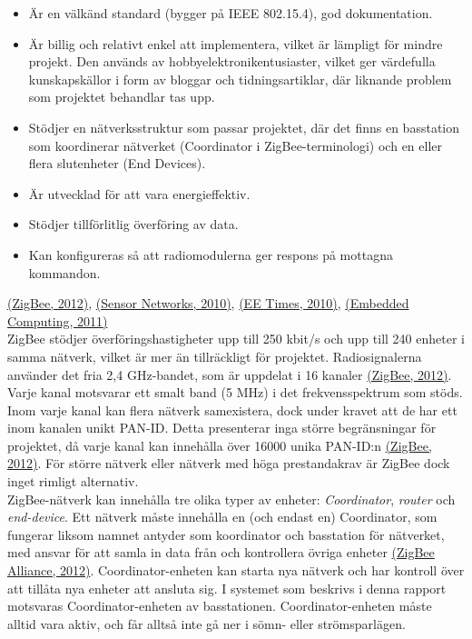 \documentclass[a4paper,11pt]{article}
\begin{document}
	\begin{itemize}
    	\item Är en välkänd standard (bygger på IEEE 802.15.4), god dokumentation.
    	\item Är billig och relativt enkel att implementera, vilket är lämpligt för mindre projekt. Den används av hobbyelektronikentusiaster, vilket ger värdefulla kunskapskällor i form av bloggar och tidningsartiklar, där liknande problem som projektet behandlar tas upp.
    	\item Stödjer en nätverksstruktur som passar projektet, där det finns en basstation som koordinerar nätverket (Coordinator i ZigBee-terminologi) och en eller flera slutenheter (End Devices).
    	\item Är utvecklad för att vara energieffektiv.
    	\item Stödjer tillförlitlig överföring av data.
    	\item Kan konfigureras så att radiomodulerna ger respons på mottagna kommandon.
    	\end{itemize}
\hyperref[zigbee]{(ZigBee, 2012)}, \hyperref[sensornetworks]{(Sensor Networks, 2010)}, \hyperref[eetimes]{(EE Times, 2010)}, \hyperref[embedded]{(Embedded Computing, 2011)}\\
    	
ZigBee stödjer överföringshastigheter upp till 250 kbit/s och upp till 240 enheter i samma nätverk, vilket är mer än tillräckligt för projektet. Radiosignalerna använder det fria 2,4 GHz-bandet, som är uppdelat i 16 kanaler \hyperref[zigbee]{(ZigBee, 2012)}. Varje kanal motsvarar ett smalt band (5 MHz) i det frekvensspektrum som stöds. Inom varje kanal kan flera nätverk samexistera, dock under kravet att de har ett inom kanalen unikt PAN-ID. Detta presenterar inga större begränsningar för projektet, då varje kanal kan innehålla över 16000 unika PAN-ID:n \hyperref[zigbee]{(ZigBee, 2012)}. För större nätverk eller nätverk med höga prestandakrav är ZigBee dock inget rimligt alternativ. \\

ZigBee-nätverk kan innehålla tre olika typer av enheter: {\it Coordinator}, {\it router} och {\it end-device}. Ett nätverk måste innehålla en (och endast en) Coordinator, som fungerar liksom namnet antyder som koordinator och basstation för nätverket, med ansvar för att samla in data från och kontrollera övriga enheter \hyperref[zigbee]{(ZigBee Alliance, 2012)}. Coordinator-enheten kan starta nya nätverk och har kontroll över att tillåta nya enheter att ansluta sig. I systemet som beskrivs i denna rapport motsvaras Coordinator-enheten av basstationen. Coordinator-enheten måste alltid vara aktiv, och får alltså inte gå ner i sömn- eller strömsparlägen. \\
\end{document}
